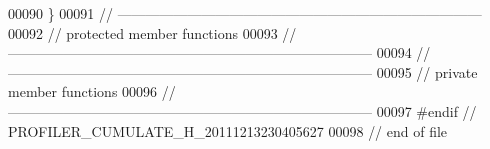 \begin{DoxyCode}
00090 \}
00091 \textcolor{comment}{//
      ------------------------------------------------------------------------------}
00092 \textcolor{comment}{// protected member functions}
00093 \textcolor{comment}{//
      ------------------------------------------------------------------------------}
00094 \textcolor{comment}{//
      ------------------------------------------------------------------------------}
00095 \textcolor{comment}{// private member functions}
00096 \textcolor{comment}{//
      ------------------------------------------------------------------------------}
00097 \textcolor{preprocessor}{#endif // PROFILER\_CUMULATE\_H\_20111213230405627}
00098 \textcolor{preprocessor}{}\textcolor{comment}{// end of file}
\end{DoxyCode}

